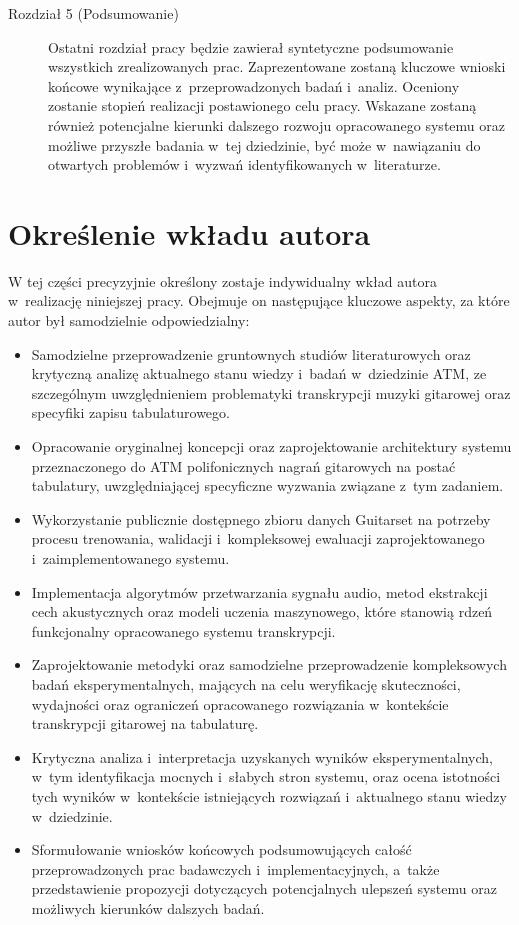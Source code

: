 \begin{description}
    \item[Rozdział 5 (Podsumowanie)] Ostatni rozdział pracy będzie zawierał syntetyczne podsumowanie wszystkich zrealizowanych prac. Zaprezentowane zostaną kluczowe wnioski końcowe wynikające z~przeprowadzonych badań i~analiz. Oceniony zostanie stopień realizacji postawionego celu pracy. Wskazane zostaną również potencjalne kierunki dalszego rozwoju opracowanego systemu oraz możliwe przyszłe badania w~tej dziedzinie, być może w~nawiązaniu do otwartych problemów i~wyzwań identyfikowanych w~literaturze.
\end{description}

\section{Określenie wkładu autora}
\label{sec:wklad_autora}

W tej części precyzyjnie określony zostaje indywidualny wkład autora w~realizację niniejszej pracy. Obejmuje on następujące kluczowe aspekty, za które autor był samodzielnie odpowiedzialny:
\begin{itemize}
    \item Samodzielne przeprowadzenie gruntownych studiów literaturowych oraz krytyczną analizę aktualnego stanu wiedzy i~badań w~dziedzinie ATM, ze szczególnym uwzględnieniem problematyki transkrypcji muzyki gitarowej oraz specyfiki zapisu tabulaturowego.
    \item Opracowanie oryginalnej koncepcji oraz zaprojektowanie architektury systemu przeznaczonego do ATM polifonicznych nagrań gitarowych na postać tabulatury, uwzględniającej specyficzne wyzwania związane z~tym zadaniem.
    \item Wykorzystanie publicznie dostępnego zbioru danych Guitarset na potrzeby procesu trenowania, walidacji i~kompleksowej ewaluacji zaprojektowanego i~zaimplementowanego systemu.
    \item Implementacja algorytmów przetwarzania sygnału audio, metod ekstrakcji cech akustycznych oraz modeli uczenia maszynowego, które stanowią rdzeń funkcjonalny opracowanego systemu transkrypcji.
    \item Zaprojektowanie metodyki oraz samodzielne przeprowadzenie kompleksowych badań eksperymentalnych, mających na celu weryfikację skuteczności, wydajności oraz ograniczeń opracowanego rozwiązania w~kontekście transkrypcji gitarowej na tabulaturę.
    \item Krytyczna analiza i~interpretacja uzyskanych wyników eksperymentalnych, w~tym identyfikacja mocnych i~słabych stron systemu, oraz ocena istotności tych wyników w~kontekście istniejących rozwiązań i~aktualnego stanu wiedzy w~dziedzinie.
    \item Sformułowanie wniosków końcowych podsumowujących całość przeprowadzonych prac badawczych i~implementacyjnych, a~także przedstawienie propozycji dotyczących potencjalnych ulepszeń systemu oraz możliwych kierunków dalszych badań.
\end{itemize}